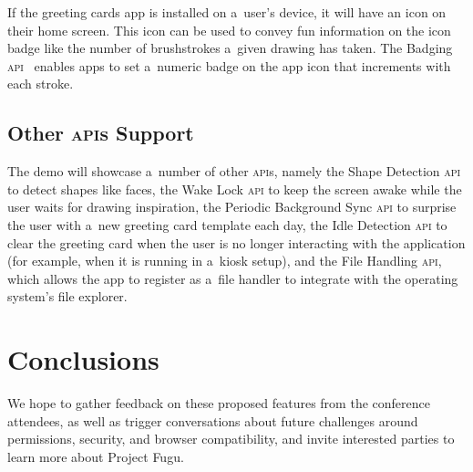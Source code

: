 \documentclass[sigconf]{acmart}
\begin{document}
If the greeting cards app is installed on a~user's device,
it will have an icon on their home screen.
This icon can be used to convey fun information on the icon badge
like the number of brushstrokes a~given drawing has taken.
The Badging \textsc{api}~\cite{giuca19} enables apps to set a~numeric badge on the app icon
that increments with each stroke.

\subsection{Other \textsc{api}s Support}

The demo will showcase a~number of other \textsc{api}s, namely the
Shape Detection \textsc{api} to detect shapes like faces,
the Wake Lock  \textsc{api} to keep the screen awake
while the user waits for drawing inspiration, 
the Periodic Background Sync  \textsc{api} to surprise the user
with a~new greeting card template each day,
the Idle Detection \textsc{api} to clear the greeting card
when the user is no longer interacting with the application
(for example, when it is running in a~kiosk setup),
and the File Handling \textsc{api}, which allows the app
to register as a~file handler to integrate with the operating system's file explorer.

\section{Conclusions}

We hope to gather feedback on these proposed features from the conference attendees,
as well as trigger conversations about future challenges around
permissions, security, and browser compatibility,
and invite interested parties to learn more about Project Fugu.



\end{document}
